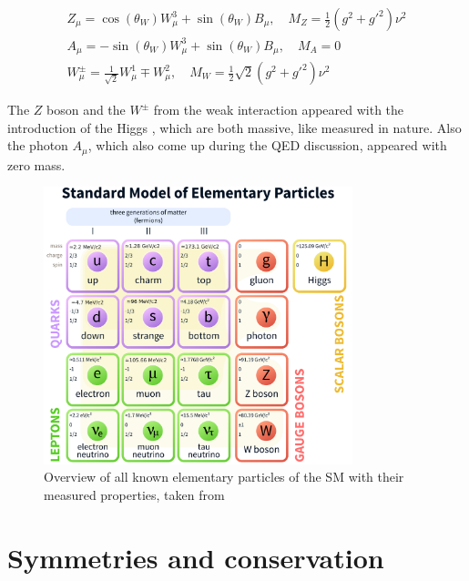 \begin{equation}
	\label{eq:eq_1_10}
	\begin{split}
		Z_{\mu} = \cos(\theta_{W})W^{3}_{\mu} + \sin(\theta_{W})B_{\mu}, \quad M_{Z} = \frac{1}{2}(g^2 + g'^2)\nu^2 \\
		A_{\mu} = -\sin(\theta_{W})W^{3}_{\mu} + \sin(\theta_{W})B_{\mu}, \quad M_{A} = 0 \\
		W^{\pm}_{\mu} = \frac{1}{\sqrt{2}}W^{1}_{\mu} \mp W^{2}_{\mu}, \quad M_{W} = \frac{1}2{\sqrt{2}}(g^2+g'^2)\nu^2
	\end{split}
\end{equation}

The $Z$ boson and the $W^{\pm}$ from the weak interaction appeared with the introduction of the Higgs \cite{HIGGDISCOVER}, which are both massive, like measured in nature. Also the photon $A_{\mu}$, which also come up during the \gls{QED} discussion, appeared with zero mass. 


\begin{figure}[hpt]
	\centering
	\includegraphics[width=0.8\textwidth]{pictures/Standard_Model_of_Elementary_Particles.pdf}

	\caption[Overview of Standard Model particles]{Overview of all known elementary particles of the \gls{SM} with their measured properties, taken from \cite{SMPARTICLES}}
	\label{fig:fig_1_1}
\end{figure}

\section{Symmetries and conservation}
\label{sec:section_1_2}

